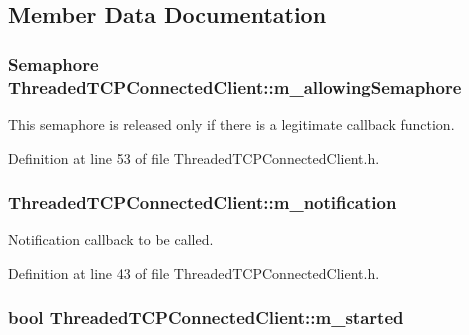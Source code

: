 \subsection{Member Data Documentation}
\hypertarget{class_threaded_t_c_p_connected_client_a30dd0658adca73cf964dda1b9788f94c}{
\subsubsection[{m\-\_\-allowing\-Semaphore}]{\setlength{\rightskip}{0pt plus 5cm}Semaphore Threaded\-T\-C\-P\-Connected\-Client\-::m\-\_\-allowing\-Semaphore\hspace{0.3cm}{\ttfamily [private]}}}\label{class_threaded_t_c_p_connected_client_a30dd0658adca73cf964dda1b9788f94c}


This semaphore is released only if there is a legitimate callback function. 



Definition at line 53 of file Threaded\-T\-C\-P\-Connected\-Client.\-h.

\hypertarget{class_threaded_t_c_p_connected_client_a2e4475f9a13d5cfbc34c28449789ef25}{
\subsubsection[{m\-\_\-notification}]{ Threaded\-T\-C\-P\-Connected\-Client\-::m\-\_\-notification\hspace{0.3cm}{\ttfamily [private]}}}\label{class_threaded_t_c_p_connected_client_a2e4475f9a13d5cfbc34c28449789ef25}


Notification callback to be called. 



Definition at line 43 of file Threaded\-T\-C\-P\-Connected\-Client.\-h.

\hypertarget{class_threaded_t_c_p_connected_client_ada47374bbca328b7eb6f187af10b32a0}{
\subsubsection[{m\-\_\-started}]{\setlength{\rightskip}{0pt plus 5cm}bool Threaded\-T\-C\-P\-Connected\-Client\-::m\-\_\-started\hspace{0.3cm}{\ttfamily [private]}}}\label{class_threaded_t_c_p_connected_client_ada47374bbca328b7eb6f187af10b32a0}


